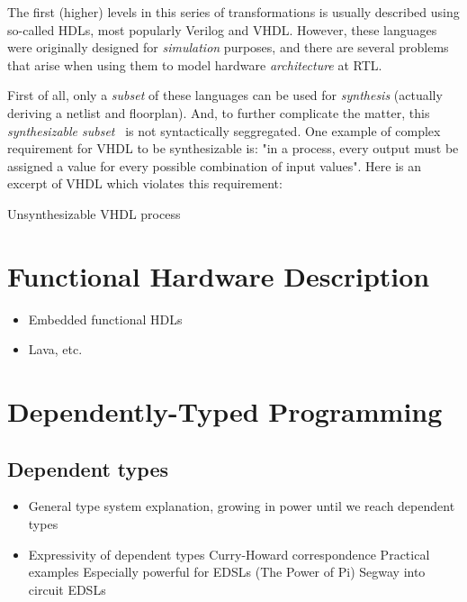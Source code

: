        The first (higher) levels in this series of transformations is usually described using
        so-called \acp{HDL}, most popularly Verilog and VHDL.
        However, these languages were originally designed for \emph{simulation} purposes,
        and there are several problems that arise when using them to model hardware
        \emph{architecture} at \ac{RTL}.

        First of all, only a \emph{subset} of these languages can be used for \emph{synthesis}
        (actually deriving a netlist and floorplan). And, to further complicate the matter,
        this \emph{synthesizable subset}~\cite{ieee1076-3-synth-vhdl} is not syntactically seggregated.
        One example of complex requirement for VHDL to be synthesizable is:
        "in a process, every output must be assigned a value for every possible combination of input values".
        Here is an excerpt of VHDL which violates this requirement:

        \begin{listing}[h]
            \begin{center}
            \end{center}
            \caption{Unsynthesizable VHDL process \label{lst:vhdl-unsynth-process}}
        \end{listing}


    \section{Functional Hardware Description}
    \label{sec:functional-hardware}
        \begin{itemize}
            \item Embedded functional HDLs
            \item Lava, etc.
        \end{itemize}


    \section{Dependently-Typed Programming}
    \label{sec:dtp}

        \subsection{Dependent types}
        \label{subsec:dependent-types}
            \begin{itemize}
                \item General type system explanation, growing in power until we reach dependent types
                \item Expressivity of dependent types
                    \subitem Curry-Howard correspondence
                    \subitem Practical examples
                        \subsubitem Especially powerful for EDSLs (The Power of Pi)
                        \subsubitem Segway into circuit EDSLs
            \end{itemize}

